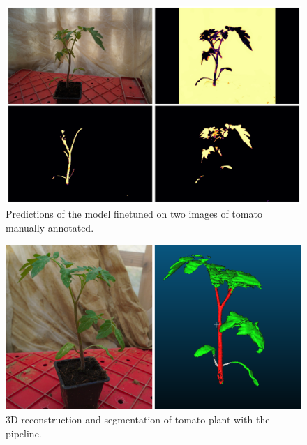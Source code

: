 \begin{figure}
    \centering \includegraphics[width = \linewidth]{figures/finetune.png}
    \caption{Predictions of the model finetuned on two images of tomato manually annotated.} \label{fig:finetune2D}
\end{figure}


\begin{figure}
    \centering \includegraphics[width = \linewidth]{figures/tomato.png}
    \caption{3D reconstruction and segmentation of tomato plant with the pipeline.} \label{fig:finetune2D}
\end{figure}


